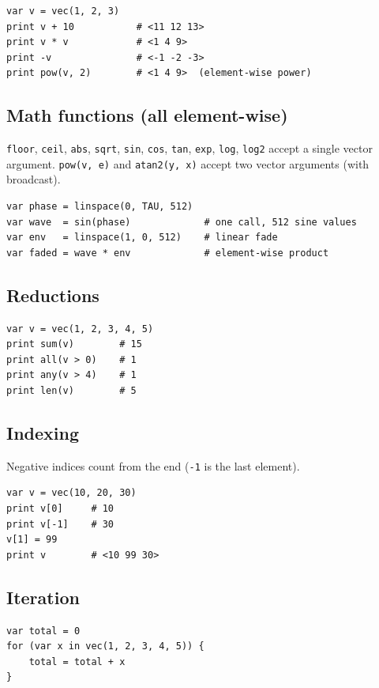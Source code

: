 \documentclass[11pt,a4paper]{article}
\begin{document}
\begin{lstlisting}
var v = vec(1, 2, 3)
print v + 10           # <11 12 13>
print v * v            # <1 4 9>
print -v               # <-1 -2 -3>
print pow(v, 2)        # <1 4 9>  (element-wise power)
\end{lstlisting}

\subsection{Math functions (all element-wise)}

\texttt{floor}, \texttt{ceil}, \texttt{abs}, \texttt{sqrt}, \texttt{sin},
\texttt{cos}, \texttt{tan}, \texttt{exp}, \texttt{log}, \texttt{log2} accept
a single vector argument. \texttt{pow(v, e)} and \texttt{atan2(y, x)} accept
two vector arguments (with broadcast).

\begin{lstlisting}
var phase = linspace(0, TAU, 512)
var wave  = sin(phase)             # one call, 512 sine values
var env   = linspace(1, 0, 512)    # linear fade
var faded = wave * env             # element-wise product
\end{lstlisting}

\subsection{Reductions}

\begin{lstlisting}
var v = vec(1, 2, 3, 4, 5)
print sum(v)        # 15
print all(v > 0)    # 1
print any(v > 4)    # 1
print len(v)        # 5
\end{lstlisting}

\subsection{Indexing}

Negative indices count from the end (\texttt{-1} is the last element).

\begin{lstlisting}
var v = vec(10, 20, 30)
print v[0]     # 10
print v[-1]    # 30
v[1] = 99
print v        # <10 99 30>
\end{lstlisting}

\subsection{Iteration}

\begin{lstlisting}
var total = 0
for (var x in vec(1, 2, 3, 4, 5)) {
    total = total + x
}
\end{lstlisting}
\end{document}
